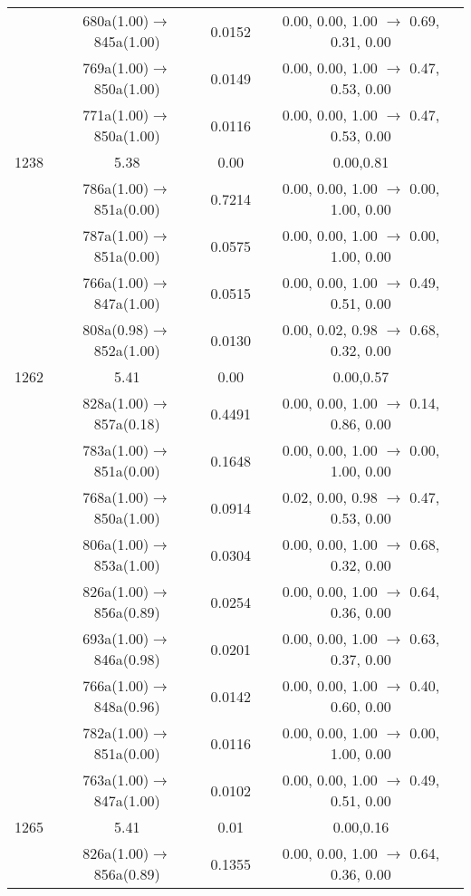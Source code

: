 \documentclass[10pt,a4paper]{article}
\begin{document}
\begin{longtable}{c|c|c|c}
 	& 680a(1.00)$\rightarrow$845a(1.00) &	 0.0152 &	 0.00, 0.00, 1.00 $\rightarrow$ 0.69, 0.31, 0.00 \\ 
 	& 769a(1.00)$\rightarrow$850a(1.00) &	 0.0149 &	 0.00, 0.00, 1.00 $\rightarrow$ 0.47, 0.53, 0.00 \\ 
 	& 771a(1.00)$\rightarrow$850a(1.00) &	 0.0116 &	 0.00, 0.00, 1.00 $\rightarrow$ 0.47, 0.53, 0.00 \\ 
 \hline1238 &	 5.38 &	 0.00 &	 0.00,0.81 \\ 
  	& 786a(1.00)$\rightarrow$851a(0.00) &	 0.7214 &	 0.00, 0.00, 1.00 $\rightarrow$ 0.00, 1.00, 0.00 \\ 
 	& 787a(1.00)$\rightarrow$851a(0.00) &	 0.0575 &	 0.00, 0.00, 1.00 $\rightarrow$ 0.00, 1.00, 0.00 \\ 
 	& 766a(1.00)$\rightarrow$847a(1.00) &	 0.0515 &	 0.00, 0.00, 1.00 $\rightarrow$ 0.49, 0.51, 0.00 \\ 
 	& 808a(0.98)$\rightarrow$852a(1.00) &	 0.0130 &	 0.00, 0.02, 0.98 $\rightarrow$ 0.68, 0.32, 0.00 \\ 
 \hline1262 &	 5.41 &	 0.00 &	 0.00,0.57 \\ 
  	& 828a(1.00)$\rightarrow$857a(0.18) &	 0.4491 &	 0.00, 0.00, 1.00 $\rightarrow$ 0.14, 0.86, 0.00 \\ 
 	& 783a(1.00)$\rightarrow$851a(0.00) &	 0.1648 &	 0.00, 0.00, 1.00 $\rightarrow$ 0.00, 1.00, 0.00 \\ 
 	& 768a(1.00)$\rightarrow$850a(1.00) &	 0.0914 &	 0.02, 0.00, 0.98 $\rightarrow$ 0.47, 0.53, 0.00 \\ 
 	& 806a(1.00)$\rightarrow$853a(1.00) &	 0.0304 &	 0.00, 0.00, 1.00 $\rightarrow$ 0.68, 0.32, 0.00 \\ 
 	& 826a(1.00)$\rightarrow$856a(0.89) &	 0.0254 &	 0.00, 0.00, 1.00 $\rightarrow$ 0.64, 0.36, 0.00 \\ 
 	& 693a(1.00)$\rightarrow$846a(0.98) &	 0.0201 &	 0.00, 0.00, 1.00 $\rightarrow$ 0.63, 0.37, 0.00 \\ 
 	& 766a(1.00)$\rightarrow$848a(0.96) &	 0.0142 &	 0.00, 0.00, 1.00 $\rightarrow$ 0.40, 0.60, 0.00 \\ 
 	& 782a(1.00)$\rightarrow$851a(0.00) &	 0.0116 &	 0.00, 0.00, 1.00 $\rightarrow$ 0.00, 1.00, 0.00 \\ 
 	& 763a(1.00)$\rightarrow$847a(1.00) &	 0.0102 &	 0.00, 0.00, 1.00 $\rightarrow$ 0.49, 0.51, 0.00 \\ 
 \hline1265 &	 5.41 &	 0.01 &	 0.00,0.16 \\ 
  	& 826a(1.00)$\rightarrow$856a(0.89) &	 0.1355 &	 0.00, 0.00, 1.00 $\rightarrow$ 0.64, 0.36, 0.00 \\ 

\end{longtable}
\end{document}

